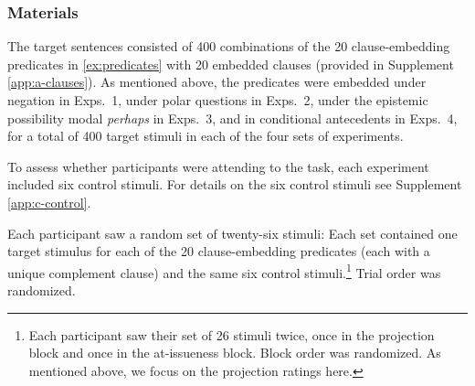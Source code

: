 \documentclass[a4paper,12pt,twoside]{article}
\begin{document}
		\subsubsection{Materials}

            The target sentences consisted of 400 combinations of the 20 clause-embedding predicates in \ref{ex:predicates} with 20 embedded clauses (provided in Supplement \ref{app:a-clauses}). As mentioned above, the predicates were embedded under negation in Exps.~1, under polar questions in Exps.~2, under the epistemic possibility modal \emph{perhaps} in Exps.~3, and in conditional antecedents in Exps.~4, for a total of 400 target stimuli in each of the four sets of experiments. 
  


To assess whether participants were attending to the task, each experiment included six control stimuli. For details on the six control stimuli see Supplement \ref{app:c-control}.

Each participant saw a random set of twenty-six stimuli: Each set contained one target stimulus for each of the 20 clause-embedding predicates (each with a unique complement clause) and the same six control stimuli.\footnote{Each participant saw their set of 26 stimuli twice, once in the projection block and once in the at-issueness block. Block order was randomized. As mentioned above, we focus on the projection ratings here.} Trial order was randomized.
  
  
\end{document}
